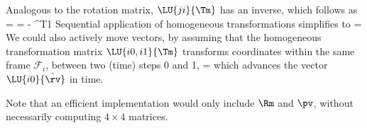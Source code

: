 Analogous to the rotation matrix, $\LU{ji}{\Tm}$ has an inverse, which follows as
\be
   =  =  {- }{\Null^T}{1}  \eqDot
\ee
Sequential application of homogeneous transformations simplifies to
\be
   =   \eqDot
\ee
We could also actively move vectors, by assuming that the homogeneous transformation matrix $\LU{i0,i1}{\Tm}$ transforms coordinates within the same frame $\mathcal{F}_i$, between two (time) steps 0 and 1,
\be
   =  
\ee
which advances the vector $\LU{i0}{\hat \rv}$ in time.

Note that an efficient implementation would only include $\Rm$ and $\pv$, without necessarily computing $4 \times 4$ matrices.

